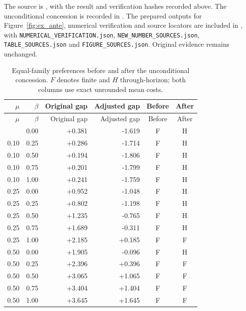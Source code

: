 \documentclass[preprint,11pt,authoryear]{elsarticle}
\begin{document}
The source is , with the result and verification hashes recorded above. The unconditional concession is recorded in . The prepared outputs for Figure~\ref{fig:ex_ante}, numerical verification and source locators are included in , with \texttt{NUMERICAL\_VERIFICATION.json}, \texttt{NEW\_NUMBER\_SOURCES.json}, \texttt{TABLE\_SOURCES.json} and \texttt{FIGURE\_SOURCES.json}. Original evidence remains unchanged.
\renewcommand{\thetable}{I3}
\begingroup\small\setlength{\tabcolsep}{5pt}\begin{longtable}{rr rr cc}
\caption{Equal-family preferences before and after the unconditional concession. $F$ denotes finite and $H$ through-horizon; both columns use exact unrounded mean costs.}\\
\toprule $\mu$ & $\beta$ & Original gap & Adjusted gap & Before & After\\\midrule
\endfirsthead
\toprule $\mu$ & $\beta$ & Original gap & Adjusted gap & Before & After\\\midrule
\endhead\bottomrule\endfoot
0.10 & 0.00 & +0.381 & -1.619 & F & H\\
0.10 & 0.25 & +0.286 & -1.714 & F & H\\
0.10 & 0.50 & +0.194 & -1.806 & F & H\\
0.10 & 0.75 & +0.201 & -1.799 & F & H\\
0.10 & 1.00 & +0.241 & -1.759 & F & H\\
0.25 & 0.00 & +0.952 & -1.048 & F & H\\
0.25 & 0.25 & +0.802 & -1.198 & F & H\\
0.25 & 0.50 & +1.235 & -0.765 & F & H\\
0.25 & 0.75 & +1.689 & -0.311 & F & H\\
0.25 & 1.00 & +2.185 & +0.185 & F & F\\
0.50 & 0.00 & +1.905 & -0.096 & F & H\\
0.50 & 0.25 & +2.396 & +0.396 & F & F\\
0.50 & 0.50 & +3.065 & +1.065 & F & F\\
0.50 & 0.75 & +3.404 & +1.404 & F & F\\
0.50 & 1.00 & +3.645 & +1.645 & F & F\\

\end{longtable}
\end{document}
